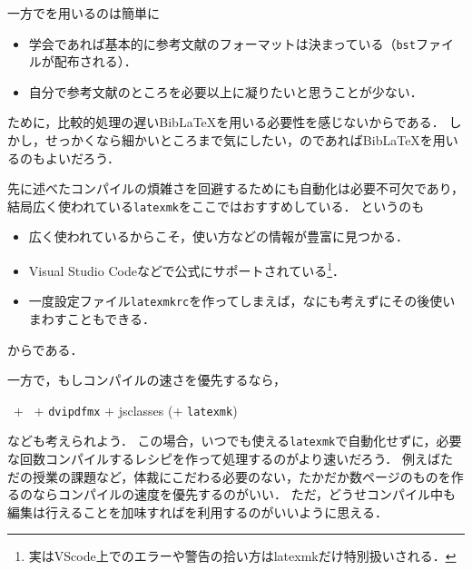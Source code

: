 \documentclass[./main]{subfiles}
\begin{document}
一方で\upBibTeX を用いるのは簡単に
\begin{itemize}
  \item 学会であれば基本的に参考文献のフォーマットは決まっている（\verb|bst|ファイルが配布される）．
  \item 自分で参考文献のところを必要以上に凝りたいと思うことが少ない．
\end{itemize}
ために，比較的処理の遅いBib\LaTeX を用いる必要性を感じないからである．
しかし，せっかくなら細かいところまで気にしたい，のであればBib\LaTeX を用いるのもよいだろう．

先に述べたコンパイルの煩雑さを回避するためにも自動化は必要不可欠であり，結局広く使われている\verb|latexmk|をここではおすすめしている．
というのも
\begin{itemize}
  \item 広く使われているからこそ，使い方などの情報が豊富に見つかる．
  \item Visual Studio Codeなどで公式にサポートされている\footnote{実はVScode上でのエラーや警告の拾い方はlatexmkだけ特別扱いされる\supercite{llmk_Workshop}．}．
  \item 一度設定ファイル\verb|latexmkrc|を作ってしまえば，なにも考えずにその後使いまわすこともできる．
\end{itemize}
からである．

一方で，もしコンパイルの速さを優先するなら，
\begin{center}
  \begin{minipage}{0.7\linewidth}
    \centering
    \begin{screen}
      \centering
      \upLaTeX\ $+$ \upBibTeX\ $+$ \verb|dvipdfmx| $+$ jsclasses ($+$ \verb|latexmk|)
    \end{screen}
  \end{minipage}\hfill
\end{center}
なども考えられよう．
この場合，いつでも使える\verb|latexmk|で自動化せずに，必要な回数コンパイルするレシピを作って処理するのがより速いだろう．
例えばただの授業の課題など，体裁にこだわる必要のない，たかだか数ページのものを作るのならコンパイルの速度を優先するのがいい．
ただ，どうせコンパイル中も編集は行えることを加味すれば\LuaLaTeX を利用するのがいいように思える．



\ifSubfilesClassLoaded{%
  \printbibliography
}%
\end{document}
